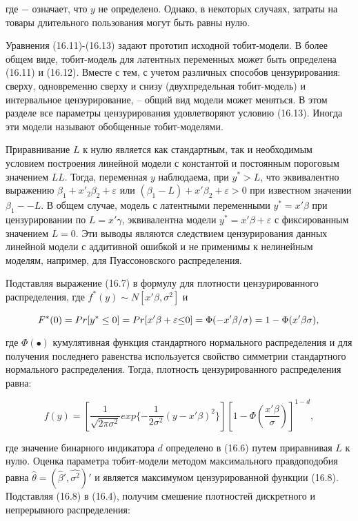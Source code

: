 где $-$ означает, что $y$ не определено. Однако, в некоторых случаях, затраты на товары длительного пользования могут быть равны нулю. 

Уравнения (16.11)-(16.13) задают прототип исходной тобит-модели. В более общем виде, тобит-модель для латентных переменных может быть определена (16.11) и (16.12). Вместе с тем, с учетом различных способов цензурирования: сверху, одновременно сверху и снизу (двухпредельная тобит-модель) и интервальное цензурирование, -- общий вид модели может меняться. В этом разделе все параметры цензурирования удовлетворяют условию (16.13). Иногда эти модели называют обобщенные тобит-моделями.

Приравнивание $L$ к нулю является как стандартным, так и необходимым условием построения линейной модели с константой и постоянным пороговым значением $LL$. Тогда, переменная $y$ наблюдаема, при $y^{*}>L$, что эквивалентно выражению $\beta_1+x'_2\beta_2+\varepsilon$ или $(\beta_1-L)+x'\beta_2+\varepsilon>0$ при известном значении $\beta_1 -- L$. В общем случае, модель с латентными переменными $y^{*}=x'\beta$ при цензурировании по $L=x'\gamma$, эквивалентна модели $y^{*}=x'\beta+\varepsilon$ с фиксированным значением $L=0$. Эти выводы являются следствием цензурирования данных линейной модели с аддитивной ошибкой и не применимы к нелинейным моделям, например, для Пуассоновского распределения.

Подставляя выражение (16.7) в формулу для плотности цензурированного распределения, где $f^{*}(y){\sim}N[x'\beta, \sigma^2]$ и 

\[
F^{*}(0)=Pr[y^{*}\leq0] \\
=Pr[x'\beta+\varepsilon{\leq}0] \\
=\Phi(-x'\beta/\sigma) \\
=1-\Phi(x'\beta\sigma), \\
\]

где $\Phi(\bullet)$ кумулятивная функция стандартного нормального распределения и для получения последнего равенства используется свойство симметрии стандартного нормального распределения. Тогда, плотность цензурированного распределения равна:

\begin{equation}
f(y)=\left[\dfrac{1}{\sqrt{2\pi\sigma^{2}}}exp\lbrace-\dfrac{1}{2\sigma^{2}}(y-x'\beta)^{2}\rbrace\right]\left[1-\Phi\left(\dfrac{x'\beta}{\sigma}\right)\right]^{1-d},
\end{equation}

где значение бинарного индикатора $d$ определено в (16.6) путем приравнивая $L$ к нулю. Оценка параметра тобит-модели методом максимального правдоподобия равна $\hat{\theta}=(\hat{\beta}',\hat{\sigma^2})'$ и является максимумом цензурированной функции (16.8). Подставляя (16.8) в (16.4), получим смешение плотностей дискретного и непрерывного распределения: 

